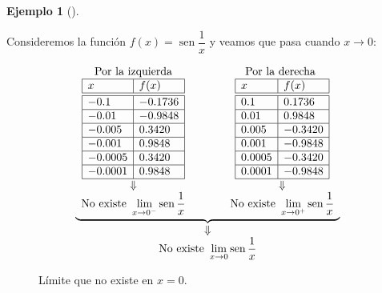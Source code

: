 \documentclass[
  a4paper,
]{scrreport}
\theoremstyle{definition}
\newtheorem{example}{Ejemplo}[chapter]
\theoremstyle{plain}
\theoremstyle{definition}
\theoremstyle{definition}
\theoremstyle{plain}
\theoremstyle{plain}
\theoremstyle{remark}
\begin{document}
\begin{example}[]\protect\hypertarget{exm-limites-no-existen-4}{}\label{exm-limites-no-existen-4}

Consideremos la función \(f(x)=\operatorname{sen} \dfrac{1}{x}\) y
veamos que pasa cuando \(x\to 0\):

\[
\begin{array}{c}
\underbrace{\begin{array}{ccc}
\mbox{Por la izquierda} & \qquad & \mbox{Por la derecha }\\
\begin{array}{|l|l|}
\hline
x      & f(x)   \\
\hline\hline
 -0.1   & -0.1736       \\
\hline
 -0.01   & -0.9848     \\
\hline
-0.005 & 0.3420 \\
\hline
 -0.001  & 0.9848  \\
\hline
-0.0005  & 0.3420\\
\hline
-0.0001 & 0.9848 \\
\hline
\end{array}
& &
\begin{array}{|l|l|}
\hline
x      & f(x)   \\
\hline\hline
 0.1   & 0.1736       \\
\hline
 0.01   & 0.9848     \\
\hline
0.005 & -0.3420 \\
\hline
 0.001  & -0.9848  \\
\hline
0.0005  & -0.3420\\
\hline
0.0001 & -0.9848 \\
\hline
\end{array}\\
\Downarrow & & \Downarrow\\
\displaystyle \mbox{No existe }\lim_{x\to 0^-}\operatorname{sen} \frac{1}{x}
& &
\displaystyle \mbox{No existe }\lim_{x\to 0^+}\operatorname{sen} \frac{1}{x}
\end{array}}\\
\Downarrow\\
\displaystyle \mbox{No existe }\lim_{x\to 0}\operatorname{sen} \frac{1}{x}
\end{array}
\]

\begin{figure}
\centering

\caption{Límite que no existe en \(x=0\).}
\end{figure}

\end{example}
\end{document}
